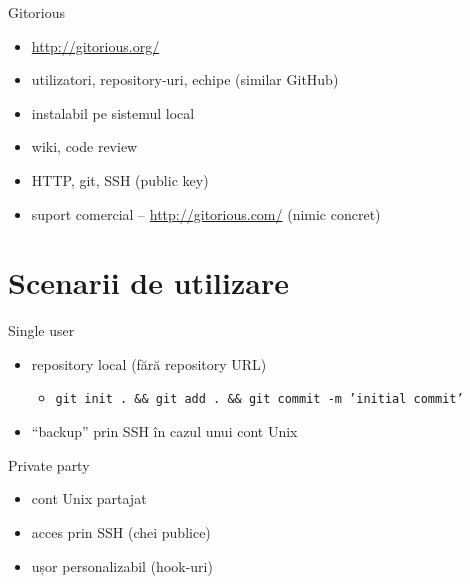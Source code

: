 \documentclass{beamer}
\begin{document}
\begin{frame}{Gitorious}
  \begin{itemize}
    \item \url{http://gitorious.org/}
    \item utilizatori, repository-uri, echipe (similar GitHub)
    \item instalabil pe sistemul local
    \item wiki, code review
    \item HTTP, git, SSH (public key)
    \item suport comercial -- \url{http://gitorious.com/} (nimic concret)
  \end{itemize}
\end{frame}

\section{Scenarii de utilizare}

\begin{frame}{Single user}
	\begin{itemize}
		\item repository local (fără repository URL)
          \begin{itemize}
            \item \texttt{git init . \&\& git add . \&\& git commit -m 'initial commit'}
          \end{itemize}
		\item ``backup'' prin SSH în cazul unui cont Unix
	\end{itemize}
\end{frame}

\begin{frame}{Private party}
	\begin{itemize}
	  \item cont Unix partajat
      \item acces prin SSH (chei publice)
      \item ușor personalizabil (hook-uri)
	\end{itemize}
\end{frame}
\end{document}
